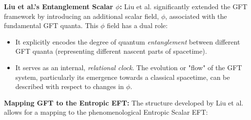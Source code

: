 \documentclass[11pt]{article}
\begin{document}
\textbf{Liu et al.'s Entanglement Scalar $\phi$:} Liu et al. \cite{Liu2023} significantly extended the GFT framework by introducing an additional scalar field, $\phi$, associated with the fundamental GFT quanta. This $\phi$ field has a dual role:
\begin{itemize}
    \item It explicitly encodes the degree of quantum \emph{entanglement} between different GFT quanta (representing different nascent parts of spacetime).
    \item It serves as an internal, \emph{relational clock}. The evolution or "flow" of the GFT system, particularly its emergence towards a classical spacetime, can be described with respect to changes in $\phi$.
\end{itemize}

\textbf{Mapping GFT to the Entropic EFT:} The structure developed by Liu et al. allows for a mapping to the phenomenological Entropic Scalar EFT:
\end{document}
